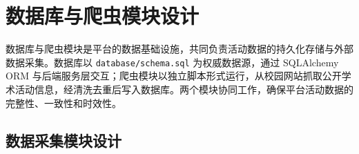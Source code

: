 \documentclass[UTF8,a4paper,12pt,fontset=none]{ctexrep}
\begin{document}
\section{数据库与爬虫模块设计}\label{ux6570ux636eux5e93ux4e0eux722cux866bux6a21ux5757ux8bbeux8ba1}

数据库与爬虫模块是平台的数据基础设施，共同负责活动数据的持久化存储与外部数据采集。数据库以 \texttt{database/schema.sql} 为权威数据源，通过 SQLAlchemy ORM 与后端服务层交互；爬虫模块以独立脚本形式运行，从校园网站抓取公开学术活动信息，经清洗去重后写入数据库。两个模块协同工作，确保平台活动数据的完整性、一致性和时效性。

\subsection{数据采集模块设计}\label{ux6570ux636eux91c7ux96c6ux6a21ux5757ux8bbeux8ba1}
\end{document}
